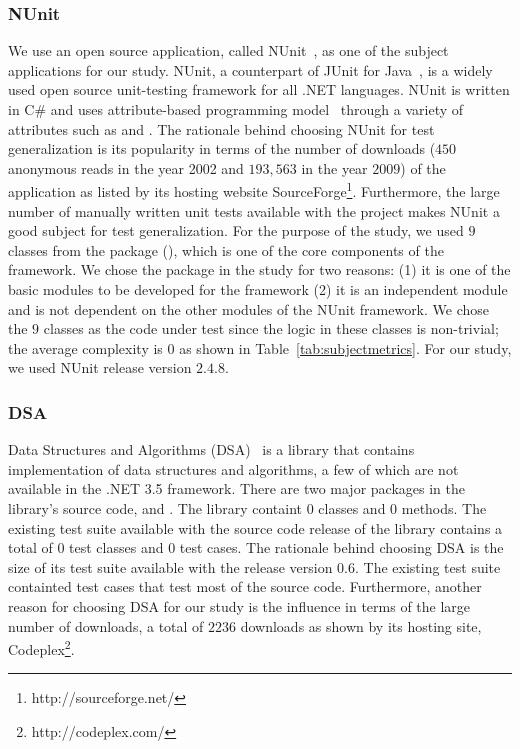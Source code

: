 \subsubsection{NUnit}
\label{sec:nunit}
We use an open source application, called NUnit~\cite{nunit}, as one of the subject applications for our study. NUnit, a counterpart of JUnit for Java~\cite{JUnit}, is a widely used open source unit-testing framework for all .NET languages. NUnit is written in C\# and uses attribute-based programming model~\cite{TDD} through a variety of attributes such as \CodeIn{[TestFixture]} and \CodeIn{[Test]}. The rationale behind choosing NUnit for test generalization is its popularity in terms of the number of downloads ($450$ anonymous reads in the year 2002 and $193,563$ in the year $2009$) of the application as listed by its hosting website SourceForge\footnote{http://sourceforge.net/}. Furthermore, the large number of manually written unit tests available with the project makes NUnit a good subject for test generalization. For the purpose of the study, we used $9$ classes from the  package (), which is one of the core components of the framework. We chose the  package in the study for two reasons: (1) it is one of the basic modules to be developed for the framework (2) it is an independent module and is not dependent on the other modules of the NUnit framework. We chose the $9$ classes as the code under test since the logic in these classes is non-trivial; the average complexity is $0$ as shown in Table~\ref{tab:subjectmetrics}. For our study, we used NUnit release version $2.4.8$. 

\subsubsection{DSA}

Data Structures and Algorithms (DSA)~\cite{dsa} is a library that contains implementation of data structures and algorithms, a few of which are not available in the .NET 3.5 framework. There are two major packages in the library's source code,  and . The library containt $0$ classes and $0$ methods. The existing test suite available with the source code release of the library contains a total of $0$ test classes and $0$ test cases. The rationale behind choosing DSA is the size of its test suite available with the release version $0.6$. The existing test suite containted test cases that test most of the source code. Furthermore, another reason for choosing DSA for our study is the influence in terms of the large number of downloads, a total of $2236$ downloads as shown by its hosting site, Codeplex\footnote{http://codeplex.com/}. 

